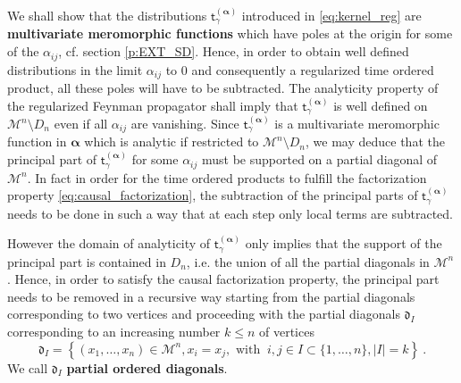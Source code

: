 \documentclass[11pt]{book}
\newcommand{\alphabd}{\boldsymbol{\alpha}}
\newcommand{\abs}[1]{\left|#1\right|}
\newcommand{\Mcal}{\mathcal{M}}
\newcommand{\drak}{\mathfrak{d}}
\newcommand{\tsf}{\mathsf{t}}
\theoremstyle{break}
\begin{document}
\bigskip


We shall show that the distributions $\tsf^{(\alphabd)}_\gamma$ introduced in \eqref{eq:kernel_reg} are \textbf{multivariate meromorphic functions} which have poles at the origin for some of the $\alpha_{ij}$, cf. section \ref{p:EXT_SD}. Hence, in order to obtain well defined distributions in the limit $\alpha_{ij}$ to $0$ and consequently a regularized time ordered product, all these poles will have to be subtracted. The analyticity property of the regularized Feynman propagator shall imply that $\tsf^{(\alphabd)}_\gamma$ is well defined on $ \Mcal^n \setminus D_n $ even if all $\alpha_{ij}$ are vanishing. Since $\tsf^{(\alphabd)}_\gamma$ is a multivariate meromorphic function in $\alphabd$  which is analytic if restricted to $\Mcal^n\setminus D_n$, we may deduce that the principal part of $\tsf^{(\alphabd)}_\gamma$ for some $\alpha_{ij}$ must be supported on a partial diagonal of $\Mcal^n$. In fact in order for the time ordered products to fulfill the factorization property \eqref{eq:causal_factorization}, the subtraction of the principal parts of $\tsf^{(\alphabd)}_\gamma$ needs to be done in such a way that at each step only local terms are subtracted. 


However the domain of analyticity of $\tsf^{(\alphabd)}_\gamma$ only implies that the support of the principal part is contained in $D_n$, i.e. the union of all the partial diagonals in $\Mcal^n$. Hence, in order to satisfy the causal factorization property, the principal part needs to be removed in a recursive way starting from the partial diagonals corresponding to two vertices and proceeding with the partial diagonals $\drak_{I}$ corresponding to an increasing number $k \leq n$ of vertices 
%
\begin{equation*}
\drak_{I} = \left\{ (x_1,\dots, x_n) \in \Mcal^n, x_i=x_j, \mbox{ with } \ i,j \in I\subset \{1,\dots, n\} , \abs{I} = k \right\} \ . 
\end{equation*}
%
We call $\drak_{I}$ \textbf{partial ordered diagonals}. 


\bigskip
\end{document}
